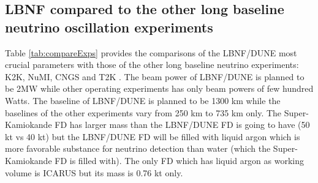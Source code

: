 \subsection{LBNF compared to the other long baseline neutrino oscillation experiments}

Table \ref{tab:compareExps} provides the comparisons of the LBNF/DUNE most crucial parameters with those of the other long baseline neutrino experiments: K2K, NuMI, CNGS and T2K \cite{ref_LBN_OscExpReview}. The beam power of LBNF/DUNE is planned to be 2MW while other operating experiments has only beam powers of few hundred Watts. The baseline of LBNF/DUNE is planned to be 1300 km while the baselines of the other experiments vary from 250 km to 735 km only. The Super-Kamiokande FD has larger mass than the LBNF/DUNE FD is going to have (50 kt vs 40 kt) but the LBNF/DUNE FD will be filled with liquid argon which is more favorable substance for neutrino detection than water (which the Super-Kamiokande FD is filled with). The only FD which has liquid argon as working volume is ICARUS but its mass is 0.76 kt only. 


